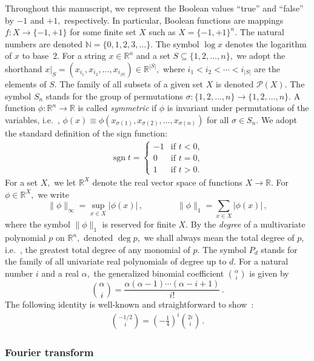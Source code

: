 \documentclass[10pt]{article}
\theoremstyle{definition}
\providecommand{\ie}{i.e.\ }
\numberwithin{equation}{section}
\newcommand{\R}{{\mathbb R}}
\newcommand{\moo}{\{-1,+1\}}
\newcommand{\moon}{\moo^n}
\newcommand{\oneton}{\{1,2,\dots,n\}}
\newcommand{\ccases}[1]{\begin{cases}#1\end{cases}}
\DeclareMathOperator{\sign}{sgn}
\begin{document}
Throughout this manuscript, we represent the Boolean
values ``true'' and ``false'' by $-1$ and $+1,$
respectively. In particular, Boolean functions are
mappings $f\colon X\to\moo$ for some finite set $X$
such as $X=\moon$. The natural numbers are denoted
$\mathbb N=\{0,1,2,3,\dots\}$. The symbol $\log x$
denotes the logarithm of $x$ to base~$2$.
For a string $x\in\R^n$ and a set $S\subseteq\oneton,$
we adopt the shorthand
$x|_S=(x_{i_1},x_{i_2},\dots,x_{i_{|S|}})\in\R^{|S|},$
where $i_1<i_2<\cdots<i_{|S|}$ are the elements of $S$. 
The family of all subsets of a given set $X$ is denoted
$\mathcal{P}(X)$. The symbol $S_n$ stands for the group
of permutations $\sigma\colon\oneton\to\oneton$. A
function
$\phi\colon\R^n\to\R$ is called \emph{symmetric}
if $\phi$ is invariant under permutations of the
variables, \ie, $\phi(x)\equiv
\phi(x_{\sigma(1)},x_{\sigma(2)},\dots,x_{\sigma(n)})$
for all $\sigma\in S_n$. 
We adopt the standard definition
of the sign function:
\begin{align*}
  \sign t = 
  \ccases{
  -1 &\text{if } t<0, \\
  0  &\text{if } t=0, \\
  1 &\text{if } t>0.
  }
\end{align*}
For a set $X,$ we let $\R^X$ denote the real vector
space of functions $X\to\R$. For $\phi\in\R^X,$ 
we write
\[
\|\phi\|_\infty =\sup_{x\in X} |\phi(x)|\,, 
\qquad\qquad \|\phi\|_1=\sum_{x\in X} |\phi(x)|\,,
\]
where the symbol $\|\phi\|_1$ is reserved for finite
$X$. By the \emph{degree} of a multivariate polynomial $p$
on $\R^n,$ denoted $\deg p,$ we shall always mean the
total degree of $p$, \ie, the greatest total degree of
any monomial of $p$. The symbol $P_d$ stands for the
family of all univariate real polynomials of degree up
to $d$. 
For a natural number $i$ and a real $\alpha,$ the
generalized binomial coefficient ${\alpha\choose i}$ is
given by \[{\alpha\choose
i}=\frac{\alpha(\alpha-1)\cdots(\alpha-i+1)}{i!}\,.\]
The following identity is well-known and straightforward to
show~\cite[p.~186]{concrete-math}:
\begin{align}
{-1/2\choose i}=\left(-\frac14\right)^i{2i\choose i}\,.
\label{eqn:gen-binom}
\end{align}

 
\subsubsection*{Fourier transform}
\end{document}
